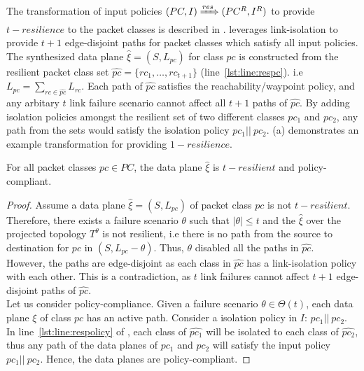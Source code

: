 \noindent The transformation of input policies $(PC, I) \xRightarrow{res} (PC^R, I^R)$ to provide $t-resilience$ to the packet classes is described in . 
\name leverages link-isolation to provide $t+1$ edge-disjoint paths for packet classes which satisfy all input policies.  
The synthesized data plane $\hat{\xi} = (S, L_{pc})$ for class $pc$ is constructed from the 
resilient packet class set $\hat{pc} = \{rc_1,\ldots,rc_{t+1}\}$ (line~\ref{lst:line:respc}).
i.e $L_{pc} = \sum\limits_{rc \in \hat{pc}} L_{rc}$. 
Each path of $\hat{pc}$ satisfies the reachability/waypoint policy, and any arbitary $t$ link failure scenario cannot affect all $t+1$ paths of $\hat{pc}$.
By adding isolation policies amongst the resilient set of two different classes $pc_1$ and $pc_2$, any path from the sets
would satisfy the isolation policy $pc_1 || \ pc_2$.
(a) demonstrates an example transformation for providing $1-resilience$. 

\begin{theorem}[Soundness]
	For all packet classes $pc \in PC$, the data plane $\hat{\xi}$ is $t-resilient$ 
	and policy-compliant. 
\end{theorem}
\begin{proof}
	Assume a data plane $\hat{\xi} = (S, L_{pc})$ of packet class $pc$ is not $t-resilient$. 
	Therefore, there exists a failure scenario $\theta$ such that $|\theta| \leq t$ 
	and  the $\hat{\xi}$ over the projected topology $T^\theta$ 
	is not resilient, i.e there is no path from the source to destination for
	$pc$ in $(S,L_{pc} - \theta)$.
	Thus, $\theta$ disabled all the paths in $\hat{pc}$. \\
	However, the paths are
	edge-disjoint as each class in $\hat{pc}$ has a link-isolation policy with each 
	other. This is a contradiction, as $t$ link failures cannot affect $t+1$ 
	edge-disjoint paths of $\hat{pc}$. \\
	Let us consider policy-compliance. Given a failure scenario $\theta \in \Theta(t)$, each data plane $\xi$ of class $pc$ has an active path. Consider a isolation policy in $I$: $pc_1 || \ pc_2$. In line~\ref{lst:line:respolicy} of , each class of $\hat{pc_1}$ will be isolated to
	each class of $\hat{pc_2}$, thus any path of the data planes of $pc_1$ and
	$pc_2$ will satisfy the input policy $pc_1 || \ pc_2$. Hence, the data planes 
	are policy-compliant. 
\end{proof}

